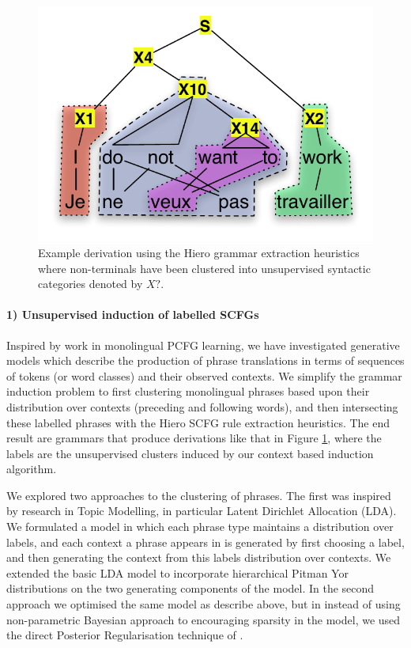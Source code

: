 \begin{figure}
  \centering
  \includegraphics[scale=0.5]{intro_slides/JeNeVeuxPasTravailler-hiero-labelled.pdf}
\caption{Example derivation using the Hiero grammar extraction heuristics where non-terminals have been clustered into unsupervised syntactic categories denoted by $X?$.}
\label{fig:intro_labelled_hiero}
\end{figure}


\paragraph{1) Unsupervised induction of labelled SCFGs}
Inspired by work in monolingual PCFG learning, we have investigated generative models which describe the production of phrase translations in terms of sequences of tokens (or word classes) and their observed contexts.
We simplify the grammar induction problem to first clustering monolingual phrases based upon their distribution over contexts (preceding and following words), and then intersecting these labelled phrases with the Hiero \cite{chiang07hierarchical} SCFG rule extraction heuristics. 
The end result are grammars that produce derivations like that in Figure \ref{fig:intro_labelled_hiero}, where the labels are the unsupervised clusters induced by our context based induction algorithm.

We explored two approaches to the clustering of phrases.
The first was inspired by research in Topic Modelling, in particular Latent Dirichlet Allocation (LDA).
We formulated a model in which each phrase type maintains a distribution over labels, and each context a phrase appears in is generated by first choosing a label, and then generating the context from this labels distribution over contexts.
We extended the basic LDA model to incorporate hierarchical Pitman Yor distributions on the two generating components of the model.
In the second approach we optimised the same model as describe above, but in instead of using non-parametric Bayesian approach to encouraging sparsity in the model, we used the direct Posterior Regularisation technique of \cite{someone}. 

